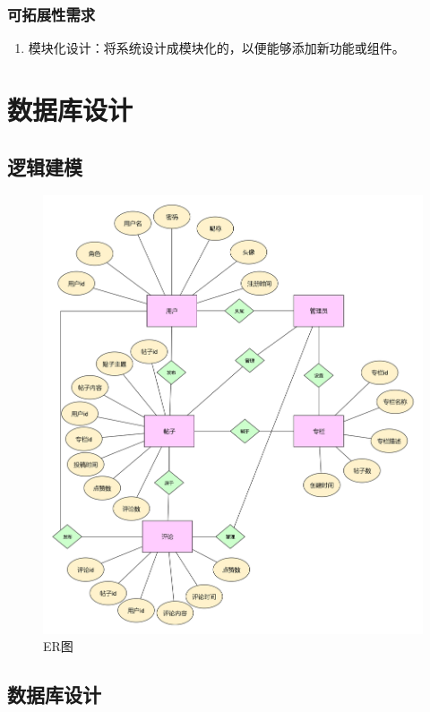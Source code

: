\documentclass[UTF8]{ctexart}
\begin{document}
\subsubsection{可拓展性需求}
\begin{enumerate}
  \item 模块化设计：将系统设计成模块化的，以便能够添加新功能或组件。
\end{enumerate}




\newpage
\section{数据库设计}

\subsection{逻辑建模}

\begin{figure}[H]
  \centering
  \includegraphics[scale=0.2]{数据库部分/bbs-ER图.jpg}
  \caption{ER图}
\end{figure}


\subsection{数据库设计}
\end{document}
